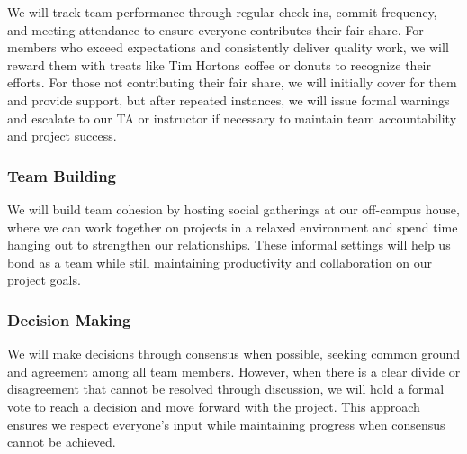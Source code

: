 \documentclass{article}
\begin{document}
We will track team performance through regular check-ins, commit frequency, and meeting attendance to ensure everyone contributes their fair share. 
For members who exceed expectations and consistently deliver quality work, we will reward them with treats like Tim Hortons coffee or donuts to recognize their efforts. 
For those not contributing their fair share, we will initially cover for them and provide support, but after repeated instances, we will issue formal warnings and escalate 
to our TA or instructor if necessary to maintain team accountability and project success.

\subsubsection*{Team Building}

We will build team cohesion by hosting social gatherings at our off-campus house, where we can work together on projects in a relaxed environment and spend time hanging out
to strengthen our relationships. These informal settings will help us bond as a team while still maintaining productivity and collaboration on our project goals.

\subsubsection*{Decision Making} 

We will make decisions through consensus when possible, seeking common ground and agreement among all team members. However, when there is a clear divide or disagreement that 
cannot be resolved through discussion, we will hold a formal vote to reach a decision and move forward with the project. This approach ensures we respect everyone's input while 
maintaining progress when consensus cannot be achieved.
\end{document}
